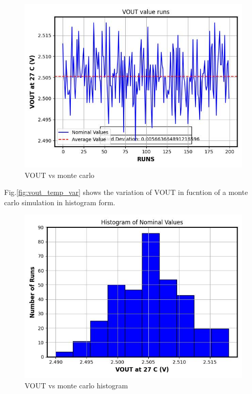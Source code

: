 \documentclass{article}
\begin{document}
\begin{figure}[H] %
    \centering
    \includegraphics[width=.7\textwidth]{./VOUT_value_runs.jpg} %
    \caption{VOUT vs monte carlo}
    \label{fig:vout_temp_var_hist}
\end{figure}




Fig.\ref{fig:vout_temp_var}  shows the variation of VOUT in fucntion of a monte carlo simulation in histogram form.

\begin{figure}[H] %
    \centering
    \includegraphics[width=.7\textwidth]{./VOUT_value_runs_histogram.jpg} %
    \caption{VOUT vs monte carlo histogram}
    \label{fig:vout_temp_var_hist}
\end{figure}
\end{document}

